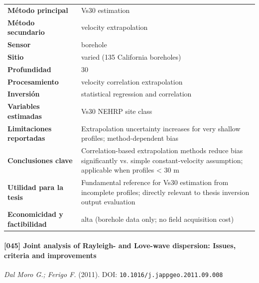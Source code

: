 \begin{center}\scriptsize
\begin{tabularx}{\textwidth}{@{}>{\bfseries}p{3.3cm} X@{}}
\toprule
M\'etodo principal & Vs30 estimation \\
M\'etodo secundario & velocity extrapolation \\
Sensor & borehole \\
Sitio & varied (135 California boreholes) \\
Profundidad & 30 \\
Procesamiento & velocity correlation extrapolation \\
Inversi\'on & statistical regression and correlation \\
Variables estimadas & Vs30 NEHRP site class \\
Limitaciones reportadas & Extrapolation uncertainty increases for very shallow profiles; method-dependent bias \\
Conclusiones clave & Correlation-based extrapolation methods reduce bias significantly vs. simple constant-velocity assumption; applicable when profiles < 30 m \\
Utilidad para la tesis & Fundamental reference for Vs30 estimation from incomplete profiles; directly relevant to thesis inversion output evaluation \\
Economicidad y factibilidad & alta (borehole data only; no field acquisition cost) \\
\bottomrule
\end{tabularx}
\end{center}

\paragraph{[045] Joint analysis of Rayleigh- and Love-wave dispersion: Issues, criteria and improvements} \emph{Dal Moro G.; Ferigo F.} (2011).
{\scriptsize DOI: \texttt{10.1016/j.jappgeo.2011.09.008}}

